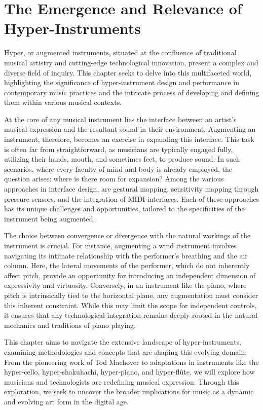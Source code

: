 \documentclass[12pt,twoside,maitrise]{dms_ks}
\theoremstyle{definition}
\begin{document}

\chapter{The Emergence and Relevance of Hyper-Instruments}

Hyper, or augmented instruments, situated at the confluence of traditional musical artistry and cutting-edge technological innovation, present a complex and diverse field of inquiry.
This chapter seeks to delve into this multifaceted world, highlighting the significance of hyper-instrument design and performance in contemporary music practices and the intricate process of developing and defining them within various musical contexts.

At the core of any musical instrument lies the interface between an artist's musical expression and the resultant sound in their environment.
Augmenting an instrument, therefore, becomes an exercise in expanding this interface.
This task is often far from straightforward, as musicians are typically engaged fully, utilizing their hands, mouth, and sometimes feet, to produce sound.
In such scenarios, where every faculty of mind and body is already employed, the question arises: where is there room for expansion?
Among the various approaches in interface design, are gestural mapping, sensitivity mapping through pressure sensors, and the integration of MIDI interfaces.
Each of these approaches has its unique challenges and opportunities, tailored to the specificities of the instrument being augmented.

The choice between convergence or divergence with the natural workings of the instrument is crucial.
For instance, augmenting a wind instrument involves navigating its intimate relationship with the performer's breathing and the air column.
Here, the lateral movements of the performer, which do not inherently affect pitch, provide an opportunity for introducing an independent dimension of expressivity and virtuosity.
Conversely, in an instrument like the piano, where pitch is intrinsically tied to the horizontal plane, any augmentation must consider this inherent constraint.
While this may limit the scope for independent controls, it ensures that any technological integration remains deeply rooted in the natural mechanics and traditions of piano playing.

This chapter aims to navigate the extensive landscape of hyper-instruments, examining methodologies and concepts that are shaping this evolving domain.
From the pioneering work of Tod Machover to adaptations in instruments like the hyper-cello, hyper-shakuhachi, hyper-piano, and hyper-flûte, we will explore how musicians and technologists are redefining musical expression.
Through this exploration, we seek to uncover the broader implications for music as a dynamic and evolving art form in the digital age.
\end{document}
